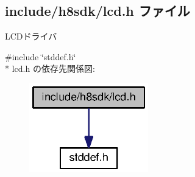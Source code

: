 \subsection{include/h8sdk/lcd.h ファイル}
\label{lcd_8h}


L\+C\+Dドライバ  


{\ttfamily \#include \char`\"{}stddef.\+h\char`\"{}}\\*
lcd.\+h の依存先関係図\+:
\nopagebreak
\begin{figure}[H]
\begin{center}
\leavevmode
\includegraphics[width=146pt]{d7/d15/lcd_8h__incl}
\end{center}
\end{figure}
